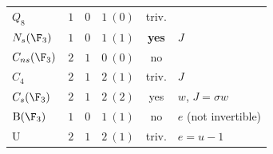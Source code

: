 \begin{proposition}
\begin{center}
\begin{tabular}{lccccl}
$Q_8$ & $1$ & $0$ & $1\ (0)$ & triv. & \\
$N_s(\F_3)$ & $1$ & $0$ & $1\ (1)$ & \textbf{yes} & $J$\\
$C_{ns}(\F_3)$ & $2$ & $1$ & $0\ (0)$ & no & \\
$C_4$ & $2$ & $1$ & $2\ (1)$ & triv. & $J$\\
$C_s(\F_3)$ & $2$ & $1$ & $2\ (2)$ & yes & $w$, $J=\sigma w$\\
$\mathrm B(\F_3)$ & $1$ & $0$ & $1\ (1)$ & no & $e$ (not invertible)\\
$\mathrm U$ & $2$ & $1$ & $2\ (1)$ & triv. & $e=u-1$\\
\bottomrule
\end{tabular}
\end{center}
\end{proposition}

